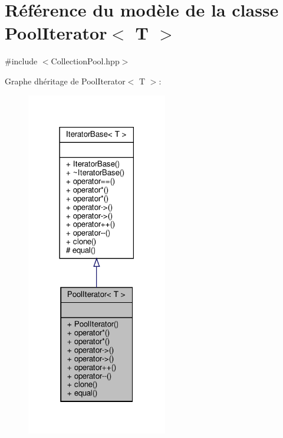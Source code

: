 \hypertarget{class_pool_iterator}{}\section{Référence du modèle de la classe Pool\+Iterator$<$ T $>$}
\label{class_pool_iterator}


{\ttfamily \#include $<$Collection\+Pool.\+hpp$>$}



Graphe d\textquotesingle{}héritage de Pool\+Iterator$<$ T $>$\+:\nopagebreak
\begin{figure}[H]
\begin{center}
\leavevmode
\includegraphics[width=174pt]{class_pool_iterator__inherit__graph}
\end{center}
\end{figure}


